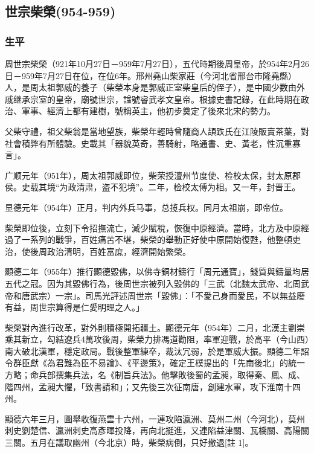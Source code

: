
\subsection{世宗柴榮\tiny(954-959)}

\subsubsection{生平}

周世宗柴榮（921年10月27日－959年7月27日），五代時期後周皇帝，於954年2月26日－959年7月27日在位，在位6年。邢州堯山柴家莊（今河北省邢台市隆堯縣）人，是周太祖郭威的養子（柴榮本身是郭威正室柴皇后的侄子），是中國少数由外戚继承宗室的皇帝，廟號世宗，諡號睿武孝文皇帝。根據史書記錄，在此時期在政治、軍事、經濟上都有建樹，號稱英主，他初步奠定了後來北宋的勢力。

父柴守禮，祖父柴翁是當地望族，柴榮年輕時曾隨商人頡跌氏在江陵販賣茶葉，對社會積弊有所體驗。史載其「器貌英奇，善騎射，略通書、史、黃老，性沉重寡言」。

广顺元年（951年），周太祖郭威即位，柴荣授澶州节度使、检校太保，封太原郡侯。史载其境“为政清肃，盗不犯境”。二年，检校太傅为相。又一年，封晋王。

显德元年（954年）正月，判内外兵马事，总揽兵权。同月太祖崩，即帝位。

柴榮即位後，立刻下令招撫流亡，減少賦稅，恢復中原經濟。當時，北方及中原經過了一系列的戰爭，百姓痛苦不堪，柴榮的舉動正好使中原開始復甦，他整頓吏治，使後周政治清明，百姓富庶，經濟開始繁榮。

顯德二年（955年）推行顯德毀佛，以佛寺銅材鑄行「周元通寶」，錢質與鑄量均居五代之冠。因为其毀佛行為，後周世宗被列入毀佛的「三武（北魏太武帝、北周武帝和唐武宗）一宗」。司馬光評述周世宗「毀佛」：「不愛己身而愛民，不以無益廢有益，周世宗算得是仁愛明理之人。」

柴榮對內進行改革，對外則積極開拓疆土。顯德元年（954年）二月，北漢主劉崇乘其新立，勾結遼兵4萬攻後周，柴榮力排馮道勸阻，率軍迎戰，於高平（今山西）南大破北漢軍，穩定政局。戰後整軍練卒，裁汰冗弱，於是軍威大振。顯德二年詔令群臣獻《為君難為臣不易論》、《平邊策》，確定王樸提出的「先南後北」的統一方略；命兵部撰集兵法，名《制旨兵法》。他擊敗後蜀的孟昶，取得秦、鳳、成、階四州，孟昶大懼，「致書請和」；又先後三次征南唐，創建水軍，攻下淮南十四州。

顯德六年三月，圖舉收復燕雲十六州，一連攻陷瀛洲、莫州二州（今河北），莫州刺史劉楚信、瀛洲刺史高彥暉投降，再向北挺進，又連陷益津關、瓦橋關、高陽關三關。五月在議取幽州（今北京）時，柴榮病倒，只好撤退[註 1]。

